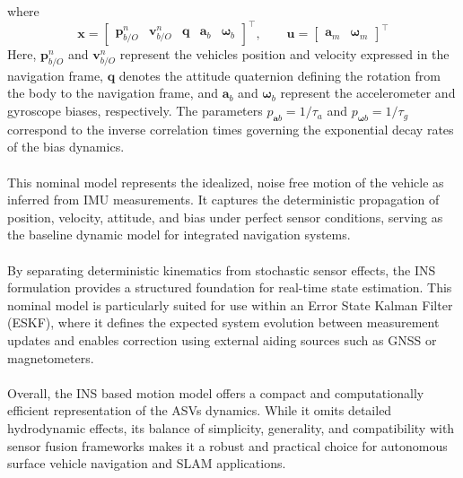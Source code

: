 where
\begin{equation}
    \mathbf{x} =
    \begin{bmatrix}
        \mathbf{p}_{b/O}^{n} & \mathbf{v}_{b/O}^{n} & \mathbf{q} & \mathbf{a}_b & \mathbf{\omega}_b
    \end{bmatrix}^\top,
    \qquad
    \mathbf{u} =
    \begin{bmatrix}
        \mathbf{a}_m & \boldsymbol{\omega}_m
    \end{bmatrix}^\top
    \label{eq:kinematics-motion-model-states}
\end{equation}
Here, $\mathbf{p}_{b/O}^{n}$ and $\mathbf{v}_{b/O}^{n}$ represent the vehicles position and velocity expressed in the navigation frame, $\mathbf{q}$ denotes the attitude quaternion defining the rotation from the body to the navigation frame, and $\mathbf{a}_b$ and $\mathbf{\omega}_b$ represent the accelerometer and gyroscope biases, respectively. The parameters $p_{\mathbf{a}b} = 1/\tau_a$ and $p_{\mathbf{\omega}b} = 1/\tau_g$ correspond to the inverse correlation times governing the exponential decay rates of the bias dynamics.  
\\ \\
This nominal model represents the idealized, noise free motion of the vehicle as inferred from IMU measurements. It captures the deterministic propagation of position, velocity, attitude, and bias under perfect sensor conditions, serving as the baseline dynamic model for integrated navigation systems.  
\\ \\
By separating deterministic kinematics from stochastic sensor effects, the INS formulation provides a structured foundation for real-time state estimation. This nominal model is particularly suited for use within an Error State Kalman Filter (ESKF), where it defines the expected system evolution between measurement updates and enables correction using external aiding sources such as GNSS or magnetometers.  
\\ \\
Overall, the INS based motion model offers a compact and computationally efficient representation of the ASVs dynamics. While it omits detailed hydrodynamic effects, its balance of simplicity, generality, and compatibility with sensor fusion frameworks makes it a robust and practical choice for autonomous surface vehicle navigation and SLAM applications.




